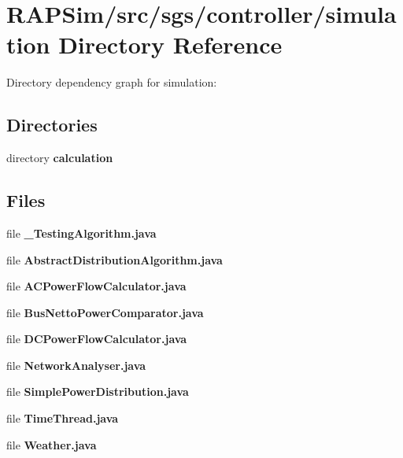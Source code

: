 \section{R\-A\-P\-Sim/src/sgs/controller/simulation Directory Reference}
\label{dir_11c07a346c0bc8bfbfc57bbc0fe68289}
Directory dependency graph for simulation\-:
\subsection*{Directories}
\begin{DoxyCompactItemize}
\item 
directory {\bf calculation}
\end{DoxyCompactItemize}
\subsection*{Files}
\begin{DoxyCompactItemize}
\item 
file {\bf \-\_\-\-Testing\-Algorithm.\-java}
\item 
file {\bf Abstract\-Distribution\-Algorithm.\-java}
\item 
file {\bf A\-C\-Power\-Flow\-Calculator.\-java}
\item 
file {\bf Bus\-Netto\-Power\-Comparator.\-java}
\item 
file {\bf D\-C\-Power\-Flow\-Calculator.\-java}
\item 
file {\bf Network\-Analyser.\-java}
\item 
file {\bf Simple\-Power\-Distribution.\-java}
\item 
file {\bf Time\-Thread.\-java}
\item 
file {\bf Weather.\-java}
\end{DoxyCompactItemize}
